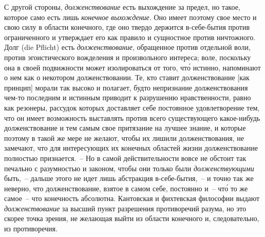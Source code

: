 С другой стороны, \emph{долженствование} есть выхождение
за предел, но такое, которое само есть лишь \emph{конечное выхождение}.
Оно имеет поэтому свое место и свою силу в
области конечного, где оно твердо держится в-себе-бытия
против ограниченного и утверждает его как правило и
сущностное против ничтожного. Долг (die Pflicht) есть
\emph{долженствование}, обращенное против отдельной воли, против
эгоистического вожделения и произвольного интереса;
воле, поскольку она в своей подвижности может изолироваться
от того, чт\'о истинно, напоминают о нем как
о некотором долженствовании. Те, кто ставит долженствование
[как принцип] морали так высоко и полагает, будто
непризнание долженствования чем-то последним и
истинным приводит к разрушению нравственности, равно
как резонеры, рассудок которых доставляет себе постоянное
удовлетворение тем, что он имеет возможность выставлять
против всего существующего какое-нибудь долженствование
и тем самым свое притязание на лучшее
знание, и которые поэтому в такой же мере не желают,
чтобы их лишили долженствования, не замечают, что для
интересующих их конечных областей жизни долженствование
полностью признается.~-- Но в самой действительности
вовсе не обстоит так печально с разумностью и законом,
чтобы они только были \emph{долженствующими} быть,~--
дальше этого не идет лишь абстракция в-себе-бытия,~-- и
точно так же неверно, что долженствование, взятое в самом
себе, постоянно и~-- чт\'о то же самое~-- что конечность
абсолютна. Кантовская и фихтевская философии
выдают \emph{долженствование} за высший пункт разрешения
противоречий разума, но это скорее точка зрения, не желающая
выйти из области конечного и, следовательно, из
противоречия.


